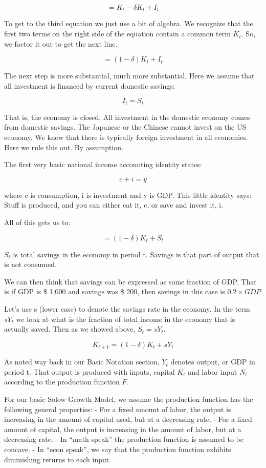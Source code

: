 \documentclass[
]{book}
\begin{document}
\[=K_t- \delta K_t+I_t\]

To get to the third equation we just use a bit of algebra. We recognize that the first two terms on the right side of the equation contain a common term \(K_t\). So, we factor it out to get the next line.

\[=(1-\delta) K_t+I_t\]

The next step is more substantial, much more substantial. Here we assume that all investment is financed by current domestic savings:

\[I_t=S_t\]

That is, the economy is closed. All investment in the domestic economy comes from domestic savings. The Japanese or the Chinese cannot invest on the US economy. We know that there is typically foreign investment in all economies. Here we rule this out. By assumption.

The first very basic national income accounting identity states:

\[c + i = y\]

where c is consumption, i is investment and y is GDP. This little identity says: Stuff is produced, and you can either eat it, c, or save and invest it, i.

All of this gets us to:

\[=(1-\delta)K_t+S_t\]

\(S_t\) is total savings in the economy in period t. Savings is that part of output that is not consumed.

We can then think that savings can be expressed as some fraction of GDP. That is if GDP is \$ 1,000 and savings was \$ 200, then savings in this case is \(0.2 \times GDP\)

Let's use s (lower case) to denote the savings rate in the economy. In the term \(sY_t\) we look at what is the fraction of total income in the economy that is actually saved. Then as we showed above, \(S_t=sY_t\).

\[K_{t+1}=(1-\delta) K_t+sY_t\]

As noted way back in our Basic Notation section, \(Y_t\) denotes output, or GDP in period t. That output is produced with inputs, capital \(K_t\) and labor input \(N_t\) according to the production function \(F\).

For our basic Solow Growth Model, we assume the production function has the following general properties:
- For a fixed amount of labor, the output is increasing in the amount of capital used, but at a decreasing rate.
- For a fixed amount of capital, the output is increasing in the amount of labor, but at a decreasing rate.
- In ``math speak'' the production function is assumed to be concave.
- In ``econ speak'', we say that the production function exhibits diminishing returns to each input.
\end{document}
